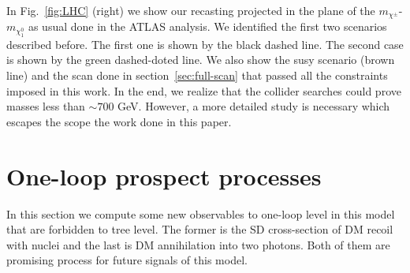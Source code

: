 \documentclass[12pt,letterpaper]{article}
\begin{document}
\begin{table}
\centering
{}
\caption{Benchmark points to looking for collider signals.}
\label{tab:B-Points}
\end{table}
In Fig.~\ref{fig:LHC} (right) we show our recasting projected in the plane of the $m_{\chi^{\pm}}$- $m_{\chi_1^0}$ as usual done in the ATLAS analysis. We identified the first two scenarios described before. 
The first one is shown by the black dashed line. 
The second case is shown by the green dashed-doted line. 
We also show the susy scenario (brown line) and the scan done in section~\ref{sec:full-scan} that passed all the constraints imposed in this work. 
In the end, we realize that the collider searches could prove masses less than $\sim 700$ GeV.
However, a more detailed study is necessary which escapes the scope the work done in this paper.



\section{One-loop prospect processes}
\label{sec:1-loop-processes}

In this section we compute some new observables to one-loop level in this model that are forbidden to tree level. The former is the SD cross-section of DM recoil with nuclei and the last is DM annihilation into two photons. Both of them are promising process for future signals of this model.
\end{document}
